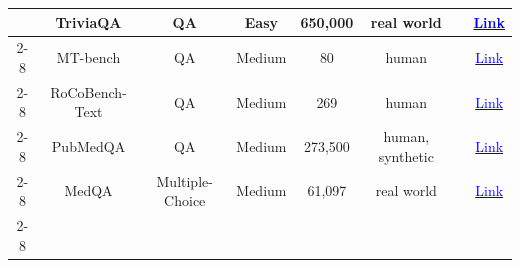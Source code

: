 \begin{table}[!htp]
{\begin{tabular}{c|c|c|c|c|c|c|c}
                                                                                  & TriviaQA               & QA                      & Easy                & 650,000          & real world          & \cite{chen2023autoagents}                                                                                                                                                       & \href{https://nlp.cs.washington.edu/triviaqa/}{\textcolor{blue}{Link}}                                                                                            \\ \cline{2-8}
                                                                                  & MT-bench               & QA                      & Medium              & 80               & human               & \cite{chen2023autoagents}                                                                                                                                                       & \href{https://github.com/lm-sys/FastChat/tree/main/fastchat/llm_judge}{\textcolor{blue}{Link}}                                                                    \\ \cline{2-8}
                                                                                  & RoCoBench-Text         & QA                      & Medium              & 269              & human               & \cite{mandi2024roco}                                                                                                                                                            & \href{https://github.com/MandiZhao/robot-collab}{\textcolor{blue}{Link}}                                                                                          \\ \cline{2-8}
                                                                                  & PubMedQA               & QA                      & Medium              & 273,500          & human, synthetic    & \cite{tang2023medagents}                                                                                                                                                        & \href{https://pubmedqa.github.io/}{\textcolor{blue}{Link}}                                                                                                        \\ \cline{2-8}
                                                                                  & MedQA                  & Multiple-Choice         & Medium              & 61,097           & real world          & \cite{nair2023dera,tang2023medagents}                                                                                         & \href{https://drive.google.com/file/d/1ImYUSLk9JbgHXOemfvyiDiirluZHPeQw/view}{\textcolor{blue}{Link}}                                                             \\ \cline{2-8}

\end{tabular}}
\end{table}
